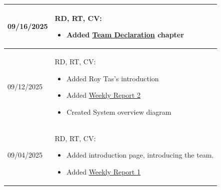 \begin{longtable}{|l||p{13.5cm}|}
09/16/2025 & RD, RT, CV:
\begin{itemize}[topsep=0pt,itemsep=0pt,parsep=0pt,partopsep=0pt,leftmargin=12pt]
    \item Added \hyperref[Chapter::TeamDeclaration]{Team Declaration} chapter
\end{itemize}
\\ \hline

09/12/2025 & RD, RT, CV:
\begin{itemize}[topsep=0pt,itemsep=0pt,parsep=0pt,partopsep=0pt,leftmargin=12pt]
    \item Added Roy Tas's introduction
    \item Added \hyperref[sec:report2]{Weekly Report 2}
    \item Created System overview diagram
\end{itemize}
\\ \hline

09/04/2025 & RD, RT, CV:
\begin{itemize}[topsep=0pt,itemsep=0pt,parsep=0pt,partopsep=0pt,leftmargin=12pt]
\item Added introduction page, introducing the team.
\item Added \hyperref[sec:report1]{Weekly Report 1}
\end{itemize} 
\\ \hline

\end{longtable}
